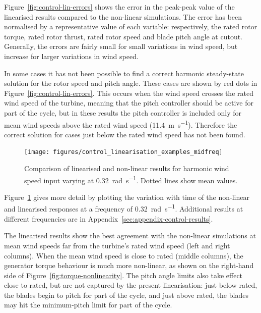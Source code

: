 \documentclass[preprint]{elsarticle}
\begin{document}
Figure~\ref{fig:control-lin-errors} shows the error in the peak-peak value of
the linearised results compared to the non-linear simulations. The error has been
normalised by a representative value of each variable: respectively, the rated
rotor torque, rated rotor thrust, rated rotor speed and blade pitch angle at
cutout. Generally, the errors are fairly small for small variations in wind
speed, but increase for larger variations in wind speed.

In some cases it has not been possible to find a correct harmonic steady-state
solution for the rotor speed and pitch angle. These cases are shown by red dots
in Figure~\ref{fig:control-lin-errors}. This occurs when the wind speed crosses
the rated wind speed of the turbine, meaning that the pitch controller should be
active for part of the cycle, but in these results the pitch controller is
included only for mean wind speeds above the rated wind speed
(\SI{11.4}{\metre\per\second}). Therefore the correct solution for cases just
below the rated wind speed has not been found.


\begin{figure}
  \centering
  \hspace*{-1cm}\texttt{[image: figures/control\_linearisation\_examples\_midfreq]}
  \caption{Comparison of linearised and non-linear results for harmonic
    wind speed input varying at \SI{0.32}{\radian\per\second}. Dotted
    lines show mean values.}
\label{fig:control-lin-midfreq}
\end{figure}

Figure~\ref{fig:control-lin-midfreq} gives more detail by plotting the variation
with time of the non-linear and linearised responses at a frequency of
\SI{0.32}{\radian\per\second}. Additional results at different frequencies are
in Appendix~\ref{sec:appendix-control-results}.

The linearised results show the best agreement with the non-linear simulations at
mean wind speeds far from the turbine's rated wind speed (left and right
columns). When the mean wind speed is close to rated (middle columns), the
generator torque behaviour is much more non-linear, as shown on the right-hand
side of Figure~\ref{fig:torque-nonlinearity}. The pitch angle limits also take
effect close to rated, but are not captured by the present linearisation: just
below rated, the blades begin to pitch for part of the cycle, and just above
rated, the blades may hit the minimum-pitch limit for part of the cycle.
\end{document}
